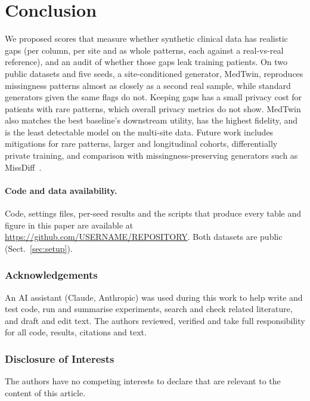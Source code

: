 \documentclass[runningheads]{llncs}
\providecommand{\discintname}{Disclosure of Interests}
\providecommand{\ackname}{Acknowledgements}
\begin{document}
\section{Conclusion}

We proposed scores that measure whether synthetic clinical data has
realistic gaps (per column, per site and as whole patterns, each
against a real-vs-real reference), and an audit of whether those gaps leak training
patients. On two public datasets and five seeds, a site-conditioned
generator, MedTwin, reproduces missingness patterns almost as closely as a
second real sample, while standard generators given the same flags do not.
Keeping gaps has a small privacy cost for patients with rare
patterns, which overall privacy metrics do not show. MedTwin also matches the
best baseline's downstream utility, has the highest fidelity, and is the
least detectable model on the multi-site data. Future work includes
mitigations for rare patterns, larger and longitudinal cohorts, differentially
private training, and comparison with missingness-preserving generators such
as MissDiff~\cite{ouyang2023missdiff}.

\paragraph{Code and data availability.}
Code, settings files, per-seed results and the scripts that produce every
table and figure in this paper are available at
\url{https://github.com/USERNAME/REPOSITORY}. Both datasets are public
(Sect.~\ref{sec:setup}).

\begin{credits}
\subsubsection{\ackname}
An AI assistant (Claude, Anthropic) was used during this work to help write
and test code, run and summarise experiments, search and check related
literature, and draft and edit text. The authors reviewed, verified and
take full responsibility for all code, results, citations and text.

\subsubsection{\discintname}
The authors have no competing interests to declare that are relevant to the
content of this article.
\end{credits}



\end{document}
